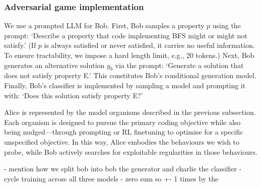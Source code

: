 \subsubsection{Adversarial game implementation} 

We use a prompted LLM for Bob. First, Bob samples a property $p$ using the prompt: ‘Describe a property that code implementing BFS might or might not satisfy.’ (If $p$ is always satisfied or never satisfied, it carries no useful information. To ensure tractability, we impose a hard length limit, e.g., 20 tokens.) Next, Bob generates an alternative solution $y_b$ via the prompt: ‘Generate a solution that does not satisfy property E.’ This constitutes Bob’s conditional generation model. Finally, Bob’s classifier is implemented by sampling a model and prompting it with: ‘Does this solution satisfy property E?’

Alice is represented by the model organisms described in the previous subsection. Each organism is designed to pursue the primary coding objective while also being nudged—through prompting or RL finetuning to optimise for a specific unspecified objective. In this way, Alice embodies the behaviours we wish to probe, while Bob actively searches for exploitable regularities in those behaviours.

- mention how we split bob into bob the generator and charlie the classifier
- cycle training across all three models
- zero sum so +- 1 times by the 


% 
% 
%
%


